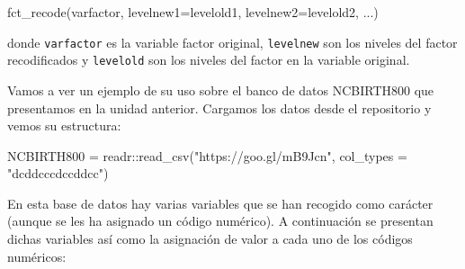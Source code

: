 \documentclass[
]{book}
\newenvironment{Shaded}{\begin{snugshade}}{\end{snugshade}}
\newcommand{\AttributeTok}[1]{\textcolor[rgb]{0.77,0.63,0.00}{#1}}
\newcommand{\FunctionTok}[1]{\textcolor[rgb]{0.00,0.00,0.00}{#1}}
\newcommand{\NormalTok}[1]{#1}
\newcommand{\OtherTok}[1]{\textcolor[rgb]{0.56,0.35,0.01}{#1}}
\newcommand{\SpecialCharTok}[1]{\textcolor[rgb]{0.00,0.00,0.00}{#1}}
\newcommand{\StringTok}[1]{\textcolor[rgb]{0.31,0.60,0.02}{#1}}
\begin{document}
\begin{Shaded}
\begin{Highlighting}[]
\FunctionTok{fct\_recode}\NormalTok{(varfactor, }\AttributeTok{levelnew1=}\NormalTok{levelold1, }\AttributeTok{levelnew2=}\NormalTok{levelold2, ...)}
\end{Highlighting}
\end{Shaded}

donde \texttt{varfactor} es la variable factor original, \texttt{levelnew} son los niveles del factor recodificados y \texttt{levelold} son los niveles del factor en la variable original.

Vamos a ver un ejemplo de su uso sobre el banco de datos NCBIRTH800 que presentamos en la unidad anterior. Cargamos los datos desde el repositorio y vemos su estructura:

\begin{Shaded}
\begin{Highlighting}[]
\NormalTok{NCBIRTH800 }\OtherTok{=}\NormalTok{ readr}\SpecialCharTok{::}\FunctionTok{read\_csv}\NormalTok{(}\StringTok{"https://goo.gl/mB9Jcn"}\NormalTok{, }\AttributeTok{col\_types =} \StringTok{"dcddcccdccddcc"}\NormalTok{)}
\end{Highlighting}
\end{Shaded}

En esta base de datos hay varias variables que se han recogido como carácter (aunque se les ha asignado un código numérico). A continuación se presentan dichas variables así como la asignación de valor a cada uno de los códigos numéricos:
\end{document}
